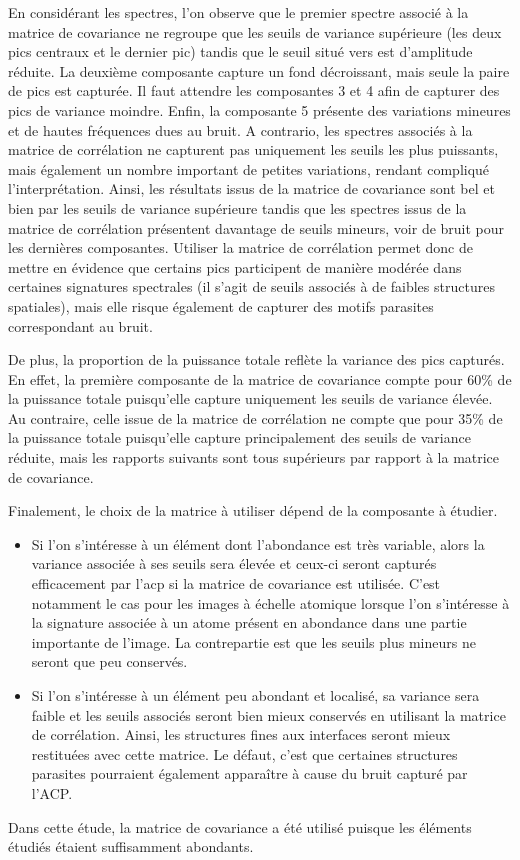         En considérant les spectres, l'on observe que le premier spectre associé à la matrice de covariance ne regroupe que les seuils de variance supérieure (les deux pics centraux et le dernier pic) tandis que le seuil situé vers  est d'amplitude réduite. La deuxième composante capture un fond décroissant, mais seule la paire de pics est capturée. Il faut attendre les composantes 3 et 4 afin de capturer des pics de variance moindre. Enfin, la composante 5 présente des variations mineures et de hautes fréquences dues au bruit. A contrario, les spectres associés à la matrice de corrélation ne capturent pas uniquement les seuils les plus puissants, mais également un nombre important de petites variations, rendant compliqué l'interprétation.
        Ainsi, les résultats issus de la matrice de covariance sont bel et bien  par les seuils de variance supérieure tandis que les spectres issus de la matrice de corrélation présentent davantage de seuils mineurs, voir de bruit pour les dernières composantes. Utiliser la matrice de corrélation permet donc de mettre en évidence que certains pics participent de manière modérée dans certaines signatures spectrales (il s'agit de seuils associés à de faibles structures spatiales), mais elle risque également de capturer des motifs parasites correspondant au bruit.

        De plus, la proportion de la puissance totale reflète la variance des pics capturés. En effet, la première composante de la matrice de covariance compte pour 60\% de la puissance totale puisqu'elle capture uniquement les seuils de variance élevée. Au contraire, celle issue de la matrice de corrélation ne compte que pour 35\% de la puissance totale puisqu'elle capture principalement des seuils de variance réduite, mais les rapports suivants sont tous supérieurs par rapport à la matrice de covariance.

        Finalement, le choix de la matrice à utiliser dépend de la composante à étudier.
        \begin{itemize}
            \item Si l'on s'intéresse à un élément dont l'abondance est très variable, alors la variance associée à ses seuils sera élevée et ceux-ci seront capturés efficacement par l'\gls{acp} si la matrice de covariance est utilisée. C'est notamment le cas pour les images à échelle atomique lorsque l'on s'intéresse à la signature associée à un atome présent en abondance dans une partie importante de l'image. La contrepartie est que les seuils plus mineurs ne seront que peu conservés.
            \item Si l'on s'intéresse à un élément peu abondant et localisé, sa variance sera faible et les seuils associés seront bien mieux conservés en utilisant la matrice de corrélation. Ainsi, les structures fines aux interfaces seront mieux restituées avec cette matrice. Le défaut, c'est que certaines structures parasites pourraient également apparaître à cause du bruit capturé par l'ACP.
        \end{itemize}
        Dans cette étude, la matrice de covariance a été utilisé puisque les éléments étudiés étaient suffisamment abondants.
        
